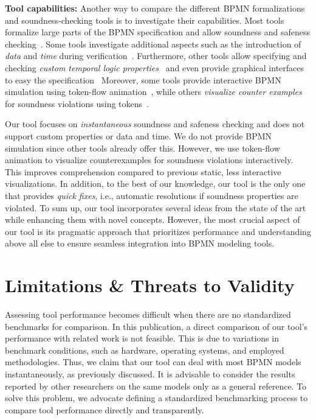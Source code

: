 \documentclass[runningheads]{llncs}
\begin{document}
\textbf{Tool capabilities:}
Another way to compare the different BPMN formalizations and soundness-checking tools is to investigate their capabilities.
Most tools formalize large parts of the BPMN specification and allow soundness and safeness checking~\cite{corradiniFormalApproachAnalysis2021,houhouFirstOrderLogicVerification2022,krauterFormalizationAnalysisBPMN2023,krauterHigherorderTransformationApproach2023}.
Some tools investigate additional aspects such as the introduction of \textit{data} and \textit{time} during verification~\cite{corradiniFormalisingAnimatingMultiple2022,houhouFirstOrderLogicVerification2022}.
Furthermore, other tools allow specifying and checking \textit{custom temporal logic properties}~\cite{corradiniFormalApproachAnalysis2021,krauterFormalizationAnalysisBPMN2023} and even provide graphical interfaces to easy the specification~\cite{krauterHigherorderTransformationApproach2023}
Moreover, some tools provide interactive BPMN simulation using token-flow animation~\cite{camundaservicesgmbhBpmnjsTokenSimulation2024,corradiniFormalisingAnimatingMultiple2022}, while others \textit{visualize counter examples} for soundness violations using tokens~\cite{houhouFirstOrderLogicVerification2022}.

Our tool focuses on \textit{instantaneous} soundness and safeness checking and does not support custom properties or data and time.
We do not provide BPMN simulation since other tools already offer this.
However, we use token-flow animation to visualize counterexamples for soundness violations interactively.
This improves comprehension compared to previous static, less interactive visualizations.
In addition, to the best of our knowledge, our tool is the only one that provides \textit{quick fixes}, i.e., automatic resolutions if soundness properties are violated.
To sum up, our tool incorporates several ideas from the state of the art while enhancing them with novel concepts.
However, the most crucial aspect of our tool is its pragmatic approach that prioritizes performance and understanding above all else to ensure seamless integration into BPMN modeling tools.

\section{Limitations \& Threats to Validity} \label{sec:limitations}
Assessing tool performance becomes difficult when there are no standardized benchmarks for comparison.
In this publication, a direct comparison of our tool's performance with related work is not feasible.
This is due to variations in benchmark conditions, such as hardware, operating systems, and employed methodologies.
Thus, we claim that our tool can deal with most BPMN models instantaneously, as previously discussed.
It is advisable to consider the results reported by other researchers on the same models only as a general reference.
To solve this problem, we advocate defining a standardized benchmarking process to compare tool performance directly and transparently.
\end{document}
